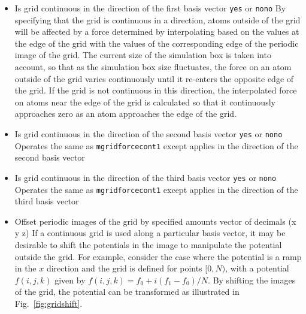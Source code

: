 \begin{itemize}
\item
{}
{Is grid continuous in the direction of the first basis vector}
{{\tt yes} or {\tt no}}{{\tt no}}
{By specifying that the grid is continuous in a direction, atoms outside of the grid will be affected by a force determined by interpolating based on the values at the edge of the grid with the values of the corresponding edge of the periodic image of the grid. The current size of the simulation box is taken into account, so that as the simulation box size fluctuates, the force on an atom outside of the grid varies continuously until it re-enters the opposite edge of the grid. If the grid is not continuous in this direction, the interpolated force on atoms near the edge of the grid is calculated so that it continuously approaches zero as an atom approaches the edge of the grid.}

\item
{}
{Is grid continuous in the direction of the second basis vector}
{{\tt yes} or {\tt no}}{{\tt no}}
{Operates the same as {\tt mgridforcecont1} except applies in the direction of the second basis vector}

\item
{}
{Is grid continuous in the direction of the third basis vector}
{{\tt yes} or {\tt no}}{{\tt no}}
{Operates the same as {\tt mgridforcecont1} except applies in the direction of the third basis vector}

\item
{}
{Offset periodic images of the grid by specified amounts}
{vector of decimals (x y z)}
{If a continuous grid is used along a particular basis vector, it may be desirable to shift the potentials in the image to manipulate the potential outside the grid. For example, consider the case where the potential is a ramp in the $x$ direction and the grid is defined for points $[0,N)$, with a potential $f(i,j,k)$ given by $f(i,j,k) = f_0 + i (f_1-f_0) / N$. By shifting the images of the grid, the potential can be transformed as illustrated in Fig.~\ref{fig:gridshift}.
}


\end{itemize}
